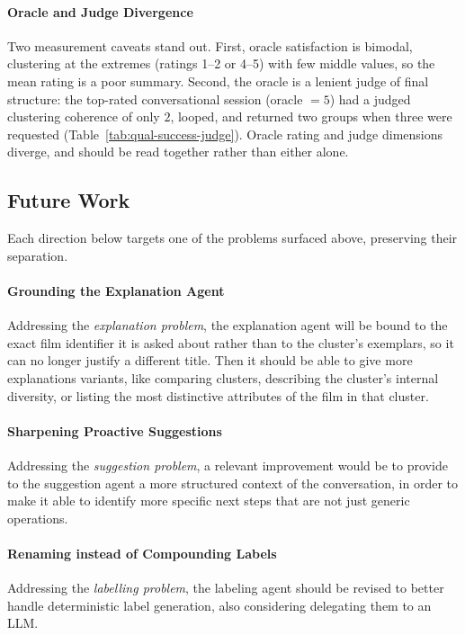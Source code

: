 \paragraph{Oracle and Judge Divergence}
Two measurement caveats stand out.
First, oracle satisfaction is bimodal, clustering at the extremes (ratings 1--2 or 4--5) with few middle values, so the mean rating is a poor summary.
Second, the oracle is a lenient judge of final structure: the top-rated conversational session (oracle $=5$) had a judged clustering coherence of only $2$, looped, and returned two groups when three were requested (Table~\ref{tab:qual-success-judge}).
Oracle rating and judge dimensions diverge, and should be read together rather than either alone.

\subsection{Future Work}
Each direction below targets one of the problems surfaced above, preserving their separation.

\paragraph{Grounding the Explanation Agent}
Addressing the \emph{explanation problem}, the explanation agent will be bound to the exact film identifier it is asked about rather than to the cluster's exemplars, so it can no longer justify a different title.
Then it should be able to give more explanations variants, like comparing clusters, describing the cluster's internal diversity, or listing the most distinctive attributes of the film in that cluster.

\paragraph{Sharpening Proactive Suggestions}
Addressing the \emph{suggestion problem}, a relevant improvement would be to provide to the suggestion agent a more structured context of the conversation, in order to make it able to identify more specific next steps that are not just generic operations.

\paragraph{Renaming instead of Compounding Labels}
Addressing the \emph{labelling problem}, the labeling agent should be revised to better handle deterministic label generation, also considering delegating them to an LLM.

